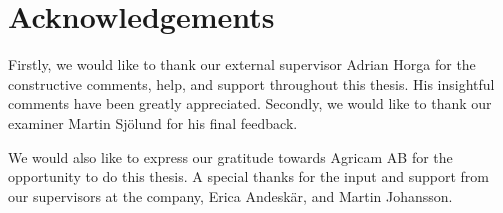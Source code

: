 \chapter*{Acknowledgements}
Firstly, we would like to thank our external supervisor Adrian Horga for the constructive comments, help, and support throughout this thesis. His insightful comments have been greatly appreciated. Secondly, we would like to thank our examiner Martin Sjölund for his final feedback.

\noindent We would also like to express our gratitude towards Agricam AB for the opportunity to do this thesis. A special thanks for the input and support from our supervisors at the company, Erica Andeskär, and Martin Johansson.  
